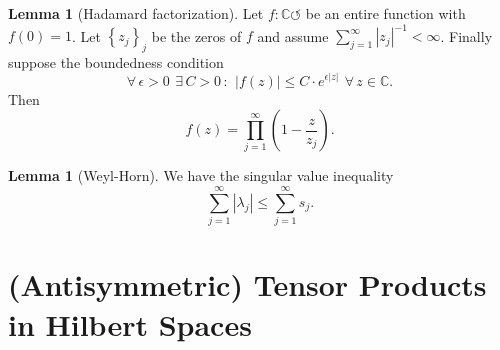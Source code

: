 \documentclass[a4paper, 10pt]{article}
\newcommand{\bbC}{\mathbb{C}}
\theoremstyle{definition}
\newtheorem{lemma}[definition]{Lemma}
\theoremstyle{remark}
\theoremstyle{remark}
\begin{document}
\begin{lemma}[Hadamard factorization]
    \label{prod}
    Let $f : \bbC \circlearrowleft$ be an entire function with $f(0) = 1$. Let $\left\{ z_j \right\}_j$ be the zeros of $f$ and assume $\sum_{j=1}^{\infty} | z_j |^{-1} < \infty$. Finally suppose the boundedness condition
    \begin{equation}
        \forall\, \epsilon > 0\,\  \exists\, C > 0 \,:\,\ | f(z) | \leq C \cdot e^{\epsilon |z|}\,\ \forall\, z \in \bbC . 
    \end{equation}
    Then 
    \begin{equation}
        f(z) = \prod_{j=1}^{\infty} (1 - \frac{z}{z_j}) . 
    \end{equation}
\end{lemma}

\begin{lemma}[Weyl-Horn]
    We have the singular value inequality 
    \begin{equation}
        \sum_{j=1}^{\infty} | \lambda_j | \leq \sum_{j=1}^{\infty} s_j . 
    \end{equation}
\end{lemma}

\section{(Antisymmetric) Tensor Products in Hilbert Spaces}
\end{document}

